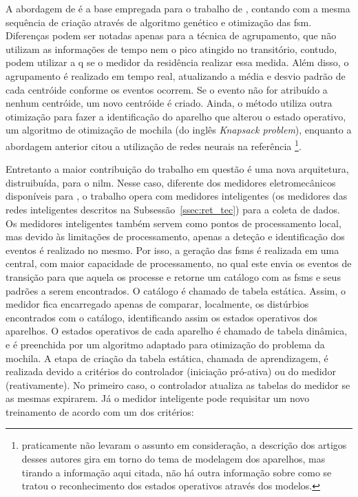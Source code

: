 \begin{enumerate}[label=\textbf{1.\arabic*},wide=\parindent]
\begin{enumerate}[label*=.\textbf{\arabic*},wide=\parindent]
\begin{itemize}[wide=\parindent]
A abordagem de \citeauthor*{nilm_baranski_summary_2004_21} é a base
empregada para o trabalho de \citet*{nilm_bergman_distribuido_2011},
contando com a mesma sequência de criação através de algoritmo
genético e otimização das \gls{fsm}. Diferenças podem ser notadas
apenas para a técnica de agrupamento, que não utilizam as informações
de tempo nem o pico atingido no transitório, contudo, podem utilizar a
\gls{q} se o medidor da residência realizar essa medida. Além disso, o
agrupamento é realizado em tempo real, atualizando a média e desvio
padrão de cada centróide conforme os eventos ocorrem. Se o evento não
for atribuído a nenhum centróide, um novo centróide é criado. Ainda, o
método utiliza outra otimização para fazer a identificação do aparelho
que alterou o estado operativo, um algoritmo de otimização de mochila
(do inglês \emph{Knapsack problem}), enquanto a abordagem anterior
citou a utilização de redes neurais na referência
\cite{nilm_baranski_genetic_base_2003_19}\footnote{
\citeauthor*{nilm_baranski_genetic_base_2003_19}
praticamente não levaram o assunto em consideração, a descrição dos
artigos desses autores gira em torno do tema de modelagem dos
aparelhos, mas tirando a informação aqui citada, não há outra
informação sobre como se tratou o reconhecimento dos estados
operativos através dos modelos.}.

Entretanto a maior contribuição do trabalho
em questão é uma nova arquitetura, distruibuída, para o \gls{nilm}.
Nesse caso, diferente dos medidores eletromecânicos disponíveis para
\citeauthor*{nilm_baranski_summary_2004_21}, o trabalho opera com
medidores inteligentes (os medidores das redes inteligentes descritos
na Subsessão~\ref{ssec:ret_tec}) para a coleta de
dados. Os medidores inteligentes também servem como pontos de
processamento local, mas devido às limitações de processamento, apenas
a deteção e identificação dos eventos é realizado no mesmo. Por isso,
a geração das \glspl{fsm} é realizada em uma central, com maior
capacidade de processamento, no qual este envia os eventos de
transição para que aquela os processe e retorne um catálogo com as
\glspl{fsm} e seus padrões a serem encontrados. O catálogo é chamado
de tabela estática. Assim, o medidor fica encarregado apenas de
comparar, localmente, os distúrbios encontrados com o catálogo,
identificando assim os estados operativos dos aparelhos. O estados
operativos de cada aparelho é chamado de tabela dinâmica, e é
preenchida por um algoritmo adaptado para otimização do problema da
mochila. A etapa de criação da
tabela estática, chamada de aprendizagem, é realizada devido a
critérios do controlador (iniciação pró-ativa) ou do medidor
(reativamente). No primeiro caso, o controlador atualiza as tabelas do
medidor se as mesmas expirarem. Já o medidor inteligente pode
requisitar um novo treinamento de acordo com um dos critérios:


\end{itemize}
\end{enumerate}
\end{enumerate}
